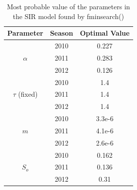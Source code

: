 \documentclass[11pt, a4paper]{article}
\begin{document}




\begin{table}[H]
\FloatBarrier
\centering
\begin{tabular}{| c | c | c |}
    \hline
    Parameter & Season & Optimal Value \\ \hline
    \multirow{3}{*}{$\alpha$} & 2010 & 0.227\\
    & 2011 & 0.283\\
    & 2012 & 0.126 \\ \hline
    \multirow{3}{*}{$\tau$ (fixed)} & 2010 & 1.4 \\ 
    & 2011 & 1.4\\
    & 2012 & 1.4\\ \hline
    \multirow{3}{*}{$m$} & 2010 & 3.3e-6\\ 
    & 2011 & 4.1e-6 \\
    & 2012 & 2.6e-6 \\ \hline
    \multirow{3}{*}{$S_o$} & 2010 & 0.162 \\ 
    & 2011 & 0.136 \\ 
    & 2012 & 0.31 \\ \hline
    \end{tabular}
    \caption{Most probable value of the parameters in the SIR model found by fminsearch()}
    \label{tab:sir}
\end{table}
\end{document}
